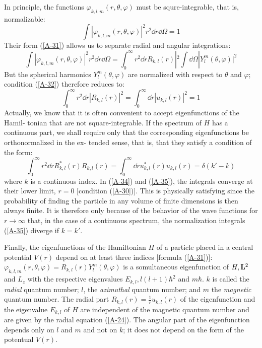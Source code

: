 In principle, the functions $\varphi_{k,l,m}(r,\theta,\varphi)$ must be squre-integrable, that is, normalizable:
\begin{equation}\label{A-32}
	\int |\varphi_{k,l,m}(r,\theta,\varphi)|^2r^2\dd r\dd \Omega = 1
\end{equation}
Their form (\ref{A-31}) allows us to separate radial and angular integrations:
\begin{equation}\label{A-33}
	\int |\varphi_{k,l,m}(r,\theta,\varphi)|^2r^2\dd r\dd \Omega =\int_0^\infty r^2\dd r R_{k,l}(r)|^2\int \dd\Omega |Y_l^m(\theta,\varphi)|^2
\end{equation}
But the spherical harmonics $Y_l^m(\theta,\varphi)$ are normalized with respect to $\theta$ and $\varphi$; condition (\ref{A-32}) therefore reduces to:
\begin{equation}\label{A-34}
	\int_0^\infty r^2\dd r |R_{k,l}(r)|^2=\int_0^\infty \dd r |u_{k,l}(r)|^2=1
\end{equation}
Actually, we know that it is often convenient to accept eigenfunctions of the Hamil- tonian that are not square-integrable. If the spectrum of $H$ has a continuous part, we shall require only that the corresponding eigenfunctions be orthonormalized in the ex- tended sense, that is, that they satisfy a condition of the form:
\begin{equation}\label{A-35}
	\int_0^\infty r^2\dd r R_{k,l}^*(r)R_{k,l}(r)=\int_0^\infty \dd r u_{k,l}^*(r)u_{k,l}(r)=\delta(k'-k)
\end{equation}
where $k$ is a continuous index.
In (\ref{A-34}) and (\ref{A-35}), the integrals converge at their lower limit, $r=0$ [condition (\ref{A-30})]. This is physically satisfying since the probability of finding the particle in any volume of finite dimensions is then always finite. It is therefore only because of the behavior of the wave functions for $r\to \infty$ that, in the case of a continuous spectrum, the normalization integrals (\ref{A-35}) diverge if $k=k'$.

Finally, the eigenfunctions of the Hamiltonian $H$ of a particle placed in a central potential $V(r)$ depend on at least three indices [formula (\ref{A-31})]: $\varphi_{k,l,m}(r,\theta,\varphi)=R_{k,l}(r)Y_l^m(\theta,\varphi)$ is a somultaneous eigenfunction of $H, \vb{L}^2$ and $L_z$ with the respective eigenvalues $E_{k,l}, l(l+1)\hbar^2$ and $m\hbar$. $k$ is called the \textit{radial} quantum number; $l$, the \textit{azimuthal} quantum number; and $m$ the \textit{magnetic} quantum number. The radial part $R_{k,l}(r)=\frac{1}{r}u_{k,l}(r)$ of the eigenfunction and the eigenvalue $E_{k,l}$ of $H$ are independent of the magnetic quantum number and are given by the radial equation (\ref{A-24}). The angular part of the eigenfunction depends only on $l$ and $m$ and not on $k$; it does not depend on the form of the potentual $V(r)$.

